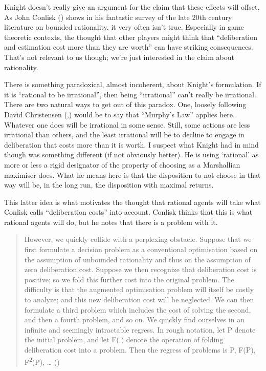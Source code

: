 \documentclass[
  10pt,
  letterpaper,
  twoside]{scrbook}
\begin{document}
Knight doesn't really give an argument for the claim that these effects
will offset. As John Conlisk () shows in
his fantastic survey of the late 20th century literature on bounded
rationality, it very often isn't true. Especially in game theoretic
contexts, the thought that other players might think that ``deliberation
and estimation cost more than they are worth'' can have striking
consequences. That's not relevant to us though; we're just interested in
the claim about rationality.

There is something paradoxical, almost incoherent, about Knight's
formulation. If it is ``rational to be irrational'', then being
``irrational'' can't really be irrational. There are two natural ways to
get out of this paradox. One, loosely following David Christensen
(,) would be to say that ``Murphy's
Law'' applies here. Whatever one does will be irrational in some sense.
Still, some actions are less irrational than others, and the least
irrational will be to decline to engage in deliberation that costs more
than it is worth. I suspect what Knight had in mind though was something
different (if not obviously better). He is using `rational' as more or
less a rigid designator of the property of choosing as a Marshallian
maximiser does. What he means here is that the disposition to not choose
in that way will be, in the long run, the disposition with maximal
returns.

This latter idea is what motivates the thought that rational agents will
take what Conlisk calls ``deliberation costs'' into account. Conlisk
thinks that this is what rational agents will do, but he notes that
there is a problem with it.

\begin{quote}
However, we quickly collide with a perplexing obstacle. Suppose that we
first formulate a decision problem as a conventional optimisation based
on the assumption of unbounded rationality and thus on the assumption of
zero deliberation cost. Suppose we then recognize that deliberation cost
is positive; so we fold this further cost into the original problem. The
difficulty is that the augmented optimisation problem will itself be
costly to analyze; and this new deliberation cost will be neglected. We
can then formulate a third problem which includes the cost of solving
the second, and then a fourth problem, and so on. We quickly find
ourselves in an infinite and seemingly intractable regress. In rough
notation, let P denote the initial problem, and let F(.) denote the
operation of folding deliberation cost into a problem. Then the regress
of problems is P, F(P), F\textsuperscript{2}(P), \ldots{}
()
\end{quote}
\end{document}
